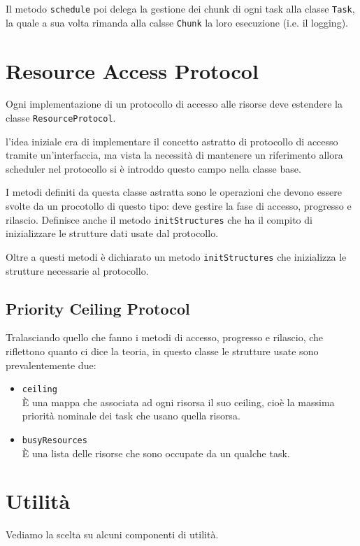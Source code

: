 \myskip

Il metodo \texttt{schedule} poi delega la gestione dei chunk di ogni task alla classe \texttt{Task}, la quale a sua volta rimanda alla calsse \texttt{Chunk} la loro esecuzione (i.e. il logging).

\section{Resource Access Protocol}
Ogni implementazione di un protocollo di accesso alle risorse deve estendere la classe \texttt{ResourceProtocol}.

l'idea iniziale era di implementare il concetto astratto di protocollo di accesso tramite un'interfaccia, ma vista la necessità di mantenere un riferimento allora scheduler nel protocollo si è introddo questo campo nella classe base.

\myskip

I metodi definiti da questa classe astratta sono le operazioni che devono essere svolte da un procotollo di questo tipo: deve gestire la fase di accesso, progresso e rilascio. Definisce anche il metodo \texttt{initStructures} che ha il compito di inizializzare le strutture dati usate dal protocollo.

Oltre a questi metodi è dichiarato un metodo \texttt{initStructures} che inizializza le strutture necessarie al protocollo.

\subsection{Priority Ceiling Protocol}
Tralasciando quello che fanno i metodi di accesso, progresso e rilascio, che riflettono quanto ci dice la teoria, in questo classe le strutture usate sono prevalentemente due:
\begin{itemize}
    \item \texttt{ceiling} \\
        È una mappa che associata ad ogni risorsa il suo ceiling, cioè la massima priorità nominale dei task che usano quella risorsa.
    \item \texttt{busyResources}\\
        È una lista delle risorse che sono occupate da un qualche task.
\end{itemize}

\section{Utilità}
Vediamo la scelta su alcuni componenti di utilità.


